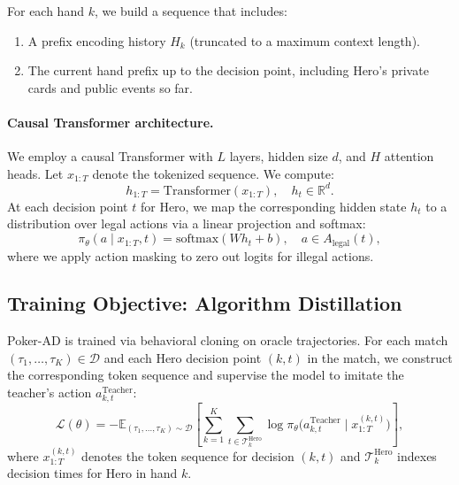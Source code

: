 \documentclass{article}
\begin{document}
For each hand $k$, we build a sequence that includes:
\begin{enumerate}[leftmargin=*]
    \item A prefix encoding history $H_k$ (truncated to a maximum context length).
    \item The current hand prefix up to the decision point, including Hero's private cards and public events so far.
\end{enumerate}

\paragraph{Causal Transformer architecture.}
We employ a causal Transformer with $L$ layers, hidden size $d$, and $H$ attention heads. Let $x_{1:T}$ denote the tokenized sequence. We compute:
\begin{equation}
    h_{1:T} = \text{Transformer}(x_{1:T}), \quad h_t \in \mathbb{R}^d.
\end{equation}
At each decision point $t$ for Hero, we map the corresponding hidden state $h_t$ to a distribution over legal actions via a linear projection and softmax:
\begin{equation}
    \pi_{\theta}(a \mid x_{1:T}, t) = \text{softmax}(W h_t + b), \quad a \in A_{\text{legal}}(t),
\end{equation}
where we apply action masking to zero out logits for illegal actions.

\subsection{Training Objective: Algorithm Distillation}
\label{sec:training_obj}

Poker-AD is trained via behavioral cloning on oracle trajectories. For each match $(\tau_1,\dots,\tau_K) \in \mathcal{D}$ and each Hero decision point $(k,t)$ in the match, we construct the corresponding token sequence and supervise the model to imitate the teacher's action $a^{\text{Teacher}}_{k,t}$:
\begin{equation}
    \mathcal{L}(\theta) 
    = - \mathbb{E}_{(\tau_1,\dots,\tau_K) \sim \mathcal{D}}
      \left[ \sum_{k=1}^{K} \sum_{t \in \mathcal{T}^{\text{Hero}}_k}
          \log \pi_{\theta}\big(a^{\text{Teacher}}_{k,t} \mid x^{(k,t)}_{1:T}\big) \right],
\end{equation}
where $x^{(k,t)}_{1:T}$ denotes the token sequence for decision $(k,t)$ and $\mathcal{T}^{\text{Hero}}_k$ indexes decision times for Hero in hand $k$.
\end{document}
